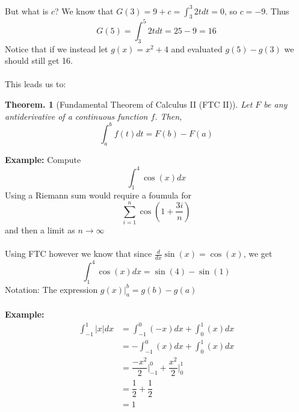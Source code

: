 \documentclass[11pt, a4paper]{memoir}
\theoremstyle{change}
\newtheorem{theorem}{Theorem.}[section]
\theoremstyle{plain}
\theoremstyle{nonumberplain}
\numberwithin{equation}{section}
\begin{document}
But what is $c$? We know that $G(3) = 9 + c = \int^3_3 2t dt = 0$, so $c = -9$. Thus $$G(5) = \int^5_3 2t dt = 25 - 9 = 16$$
Notice that if we instead let $g(x) = x^2 + 4$ and evaluated $g(5) - g(3)$ we should still get 16. \\ \: \\
This leads us to: 
\begin{theorem}[Fundamental Theorem of Calculus II (FTC II)]
  Let $F$ be any antiderivative of a continuous function $f$. Then, $$\int^b_a f(t) dt = F(b) - F(a)$$
\end{theorem}
\textbf{Example:} Compute $$\int^4_1 \cos(x) dx$$
Using a Riemann sum would require a foumula for $$\sum^n_{i=1} \cos(1 + \frac{3i}{n})$$ and then a limit as $n \to \infty$ \\ \: \\
Using FTC however we know that since $\frac{d}{dx} \sin(x) = \cos(x)$, we get $$\int^4_1 \cos(x) dx = \sin(4) - \sin(1)$$
Notation: The expression $g(x) \big |^b_a = g(b) - g(a)$ \\ \: \\
\textbf{Example:} 
\begin{align*}
  \int^1_{-1} |x| dx &= \int^0_{-1} (-x) dx + \int^1_0 (x) dx\\
  &= - \int^0_{-1} (x) dx + \int^1_0 (x) dx\\
  &= \dfrac{-x^2}{2} \bigg|^0_{-1} + \dfrac{x^2}{2} \bigg|^1_0\\
  &= \dfrac{1}{2} + \dfrac{1}{2} \\
  &= 1
\end{align*}
\end{document}
